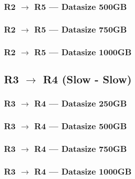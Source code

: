 \documentclass[a4paper,11pt]{article}
\begin{document}
\newpage
\subsubsection{R2 $\rightarrow$ R5 --- Datasize 500GB}



\newpage
\subsubsection{R2 $\rightarrow$ R5 --- Datasize 750GB}



\newpage
\subsubsection{R2 $\rightarrow$ R5 --- Datasize 1000GB}



\newpage


\subsection{R3 $\rightarrow$ R4 (Slow - Slow)}
\subsubsection{R3 $\rightarrow$ R4 --- Datasize 250GB}



\newpage
\subsubsection{R3 $\rightarrow$ R4 --- Datasize 500GB}



\newpage
\subsubsection{R3 $\rightarrow$ R4 --- Datasize 750GB}



\newpage
\subsubsection{R3 $\rightarrow$ R4 --- Datasize 1000GB}


\end{document}
